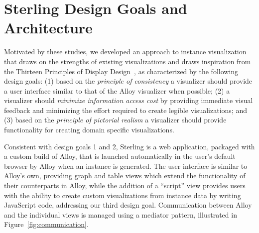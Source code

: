 \documentclass[runningheads]{llncs}
\begin{document}
\section{Sterling Design Goals and Architecture}
\label{sterling}


Motivated by these studies, we developed an approach to instance visualization that draws on the strengths of existing visualizations and draws inspiration from the Thirteen Principles of Display Design~\cite{wickens2003}, as characterized by the following design goals: (1) based on the \emph{principle of consistency} a visualizer should provide a user interface similar to that of the Alloy visualizer when possible; (2) a visualizer should \emph{minimize information access cost} by providing immediate visual feedback and minimizing the effort required to create legible visualizations; and (3) based on the \emph{principle of pictorial realism} a visualizer should provide functionality for creating domain specific visualizations.

Consistent with design goals 1 and 2, Sterling is a web application, packaged with a custom build of Alloy, that is launched automatically in the user's default browser by Alloy when an instance is generated. 
The user interface is similar to Alloy's own, providing graph and table views which extend the functionality of their counterparts in Alloy, while the addition of a ``script'' view provides users with the ability to create custom visualizations from instance data by writing JavaScript code, addressing our third design goal.
Communication between Alloy and the individual views is managed using a mediator pattern, illustrated in Figure~\ref{fig:communication}.
\end{document}
